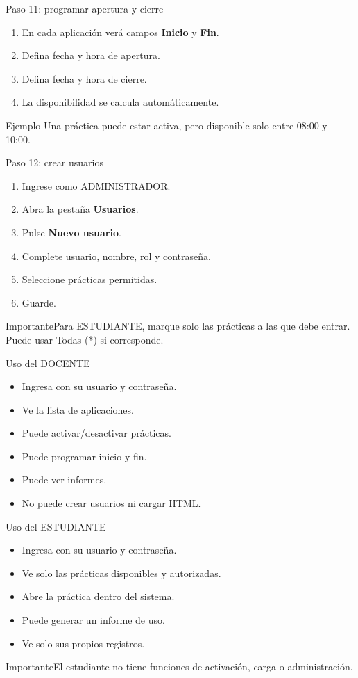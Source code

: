 \documentclass[aspectratio=169,11pt]{beamer}
\newcommand{\boton}[1]{\textcolor{azul}{\textbf{#1}}}
\newcommand{\alertbox}[1]{\begin{block}{Importante}#1\end{block}}
\begin{document}
\begin{frame}{Paso 11: programar apertura y cierre}
\begin{enumerate}
  \item En cada aplicación verá campos \boton{Inicio} y \boton{Fin}.
  \item Defina fecha y hora de apertura.
  \item Defina fecha y hora de cierre.
  \item La disponibilidad se calcula automáticamente.
\end{enumerate}
\begin{block}{Ejemplo}
Una práctica puede estar activa, pero disponible solo entre 08:00 y 10:00.
\end{block}
\end{frame}

\begin{frame}{Paso 12: crear usuarios}
\begin{enumerate}
  \item Ingrese como ADMINISTRADOR.
  \item Abra la pestaña \boton{Usuarios}.
  \item Pulse \boton{Nuevo usuario}.
  \item Complete usuario, nombre, rol y contraseña.
  \item Seleccione prácticas permitidas.
  \item Guarde.
\end{enumerate}
\alertbox{Para ESTUDIANTE, marque solo las prácticas a las que debe entrar. Puede usar Todas (*) si corresponde.}
\end{frame}

\begin{frame}{Uso del DOCENTE}
\begin{itemize}
  \item Ingresa con su usuario y contraseña.
  \item Ve la lista de aplicaciones.
  \item Puede activar/desactivar prácticas.
  \item Puede programar inicio y fin.
  \item Puede ver informes.
  \item No puede crear usuarios ni cargar HTML.
\end{itemize}
\end{frame}

\begin{frame}{Uso del ESTUDIANTE}
\begin{itemize}
  \item Ingresa con su usuario y contraseña.
  \item Ve solo las prácticas disponibles y autorizadas.
  \item Abre la práctica dentro del sistema.
  \item Puede generar un informe de uso.
  \item Ve solo sus propios registros.
\end{itemize}
\alertbox{El estudiante no tiene funciones de activación, carga o administración.}
\end{frame}
\end{document}
